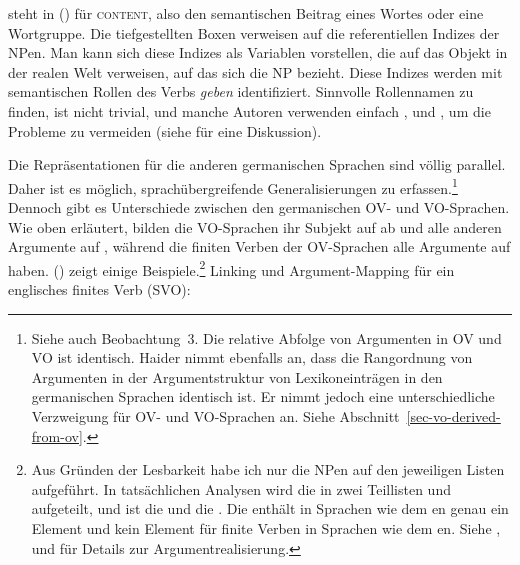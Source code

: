 \z
\cont steht in () für \textsc{content}, also den semantischen Beitrag eines Wortes oder eine Wortgruppe.
Die tiefgestellten Boxen verweisen auf die referentiellen Indizes der NPen. Man kann sich diese Indizes als
Variablen vorstellen, die auf das Objekt in der realen Welt verweisen, auf das sich die NP bezieht. Diese Indizes werden
mit semantischen Rollen des Verbs \emph{geben} identifiziert. Sinnvolle Rollennamen zu finden, ist nicht trivial,
und manche Autoren verwenden einfach \argone, \argtwo{} und \argthree, um die Probleme zu vermeiden (siehe \citealp{Dowty91a}
für eine Diskussion).

Die Repräsentationen für die anderen germanischen Sprachen sind völlig parallel. Daher ist es
möglich, sprachübergreifende Generalisierungen zu erfassen.\footnote{
  Siehe auch  Beobachtung~3. Die relative Abfolge von Argumenten in OV
  und VO ist identisch. Haider nimmt ebenfalls an, dass die Rangordnung von Argumenten in der Argumentstruktur
  von Lexikoneinträgen in den germanischen Sprachen identisch ist. Er nimmt jedoch eine unterschiedliche Verzweigung für OV-
  und VO-Sprachen an. Siehe Abschnitt~\ref{sec-vo-derived-from-ov}.
} Dennoch gibt es Unterschiede zwischen den
germanischen OV- und VO-Sprachen. Wie oben erläutert, bilden die VO-Sprachen ihr Subjekt auf \spr ab und
alle anderen Argumente auf \comps, während die finiten Verben der OV-Sprachen alle Argumente auf \comps haben.
() zeigt einige Beispiele.\footnote{%
 Aus Gründen der Lesbarkeit habe ich nur die NPen auf den jeweiligen Listen aufgeführt. In
tatsächlichen Analysen wird die \argstl in zwei Teillisten  und  aufgeteilt, und  ist die
\sprl und  die \compsl. Die \sprl enthält in Sprachen wie dem en genau ein Element und kein
Element für finite Verben in Sprachen wie dem en.
  Siehe ,  und  für Details zur Argumentrealisierung.
}
\eal
\ex Linking und Argument-Mapping für ein englisches finites Verb (SVO):\\


